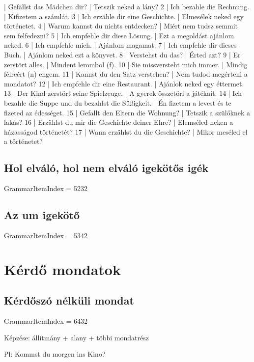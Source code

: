 \documentclass{article}
\newenvironment{desc}{\verbatim}{\endverbatim}
\newenvironment{exmp}{\verbatim}{\endverbatim}
\begin{document}
\begin{exmp}
1 | Gefällst das Mädchen dir? | Tetszik neked a lány?
2 | Ich bezahle die Rechnung. | Kifizetem a számlát.
3 | Ich erzähle dir eine Geschichte. | Elmesélek neked egy történetet.
4 | Warum kannst du nichts entdecken? | Miért nem tudsz semmit sem felfedezni?
5 | Ich empfehle dir diese Lösung. | Ezt a megoldást ajánlom neked.
6 | Ich empfehle mich. | Ajánlom magamat.
7 | Ich empfehle dir dieses Buch. | Ajánlom neked ezt a könyvet.
8 | Verstehst du das? | Érted azt?
9 | Er zerstört alles. | Mindent lerombol (f).
10 | Sie missversteht mich immer. | Mindig félreért (n) engem.
11 | Kannst du den Satz verstehen? | Nem tudod megérteni a mondatot?
12 | Ich empfehle dir eine Restaurant. | Ajánlok neked egy éttermet.
13 | Der Kind zerstört seine Spielzeuge. | A gyerek összetöri a játékait.
14 | Ich bezahle die Suppe und du bezahlst die Süßigkeit. | Én fizetem a levest és te fizeted az édességet.
15 | Gefallt den Eltern die Wohnung? | Tetszik a szülőknek a lakás?
16 | Erzählst du mir die Geschichte deiner Ehre? | Elemséled neken a házasságod történetét?
17 | Wann erzählst du die Geschichte? | Mikor meséled el a történetet?
\end{exmp}

\subsection{Hol elváló, hol nem elváló igekötős igék}

GrammarItemIndex = 5232

\subsection{Az um igekötő}

GrammarItemIndex = 5342

\section{Kérdő mondatok}

\subsection{Kérdőszó nélküli mondat}

GrammarItemIndex = 6432

\begin{desc}
Képzése: állítmány + alany + többi mondatrész

Pl: Kommst du morgen ins Kino?
\end{desc}
\end{document}

